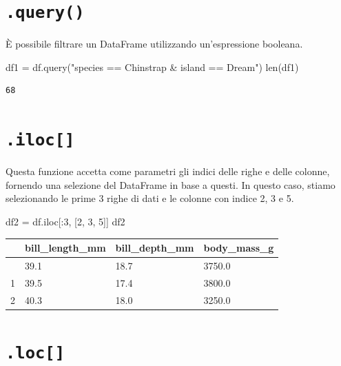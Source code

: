 \documentclass[
  letterpaper,
  krantz2]{{[}./krantz{]}}
\newenvironment{Shaded}{\begin{snugshade}}{\end{snugshade}}
\newcommand{\BuiltInTok}[1]{\textcolor[rgb]{0.00,0.23,0.31}{#1}}
\newcommand{\DecValTok}[1]{\textcolor[rgb]{0.68,0.00,0.00}{#1}}
\newcommand{\NormalTok}[1]{\textcolor[rgb]{0.00,0.23,0.31}{#1}}
\newcommand{\OperatorTok}[1]{\textcolor[rgb]{0.37,0.37,0.37}{#1}}
\newcommand{\StringTok}[1]{\textcolor[rgb]{0.13,0.47,0.30}{#1}}
\begin{document}
\section{\texorpdfstring{\texttt{.query()}}{.query()}}\label{query}

È possibile filtrare un DataFrame utilizzando un'espressione booleana.

\begin{Shaded}
\begin{Highlighting}[]
\NormalTok{df1 }\OperatorTok{=}\NormalTok{ df.query(}\StringTok{"species == \textquotesingle{}Chinstrap\textquotesingle{} \& island == \textquotesingle{}Dream\textquotesingle{}"}\NormalTok{)}
\BuiltInTok{len}\NormalTok{(df1)}
\end{Highlighting}
\end{Shaded}

\begin{verbatim}
68
\end{verbatim}

\section{\texorpdfstring{\texttt{.iloc{[}{]}}}{.iloc{[}{]}}}\label{iloc}

Questa funzione accetta come parametri gli indici delle righe e delle
colonne, fornendo una selezione del DataFrame in base a questi. In
questo caso, stiamo selezionando le prime 3 righe di dati e le colonne
con indice 2, 3 e 5.

\begin{Shaded}
\begin{Highlighting}[]
\NormalTok{df2 }\OperatorTok{=}\NormalTok{ df.iloc[:}\DecValTok{3}\NormalTok{, [}\DecValTok{2}\NormalTok{, }\DecValTok{3}\NormalTok{, }\DecValTok{5}\NormalTok{]]}
\NormalTok{df2}
\end{Highlighting}
\end{Shaded}

\begin{longtable}[]{@{}llll@{}}
\toprule\noalign{}
& bill\_length\_mm & bill\_depth\_mm & body\_mass\_g \\
\midrule\noalign{}
\endhead
\bottomrule\noalign{}
\endlastfoot
0 & 39.1 & 18.7 & 3750.0 \\
1 & 39.5 & 17.4 & 3800.0 \\
2 & 40.3 & 18.0 & 3250.0 \\
\end{longtable}

\section{\texorpdfstring{\texttt{.loc{[}{]}}}{.loc{[}{]}}}\label{loc}
\end{document}
